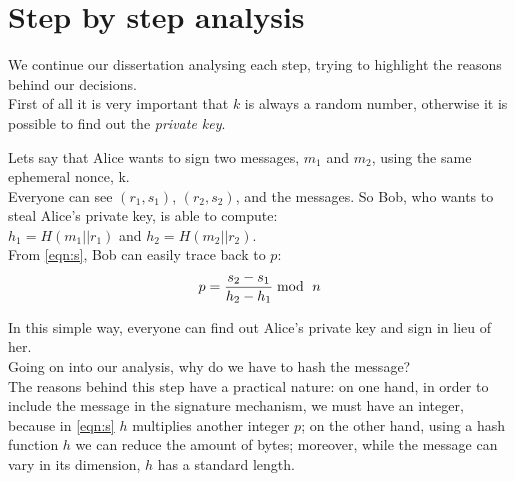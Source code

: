 \section{Step by step analysis}

We continue our dissertation analysing each step, trying to highlight the reasons behind our decisions.\\
First of all it is very important that $k$ is always a random number, otherwise it is possible to find out the \textit{private key}.
\begin{example}
	Lets say that Alice wants to sign two messages, $m_{1}$ and $m_{2}$, using the same ephemeral nonce, k.\\ Everyone can see $(r_{1},s_{1})$, $(r_{2},s_{2})$, and the messages. So Bob, who wants to steal Alice's private key, is able to compute: \\
	$h_{1}=H(m_{1}||r_{1})$ and $h_{2}=H(m_{2}||r_{2})$.\\
	From \eqref{eqn:s}, Bob can easily trace back to $p$: 
	\begin{equation}
	\label{eqn:k}
	p= \frac{s_{2}-s_{1}}{h_{2}-h_{1}} \bmod\ n\\
	\end{equation}
\end{example}

In this simple way, everyone can find out Alice's private key and sign in lieu of her.\\
Going on into our analysis, why do we have to hash the message? \\
The reasons behind this step have a practical nature: on one hand, in order to include the message in the signature mechanism, we must have an integer, because in \eqref{eqn:s} $h$ multiplies another integer $p$; on the other hand, using a hash function $h$ we can reduce the amount of bytes; moreover, while the message can vary in its dimension, $h$ has a standard length.\\


